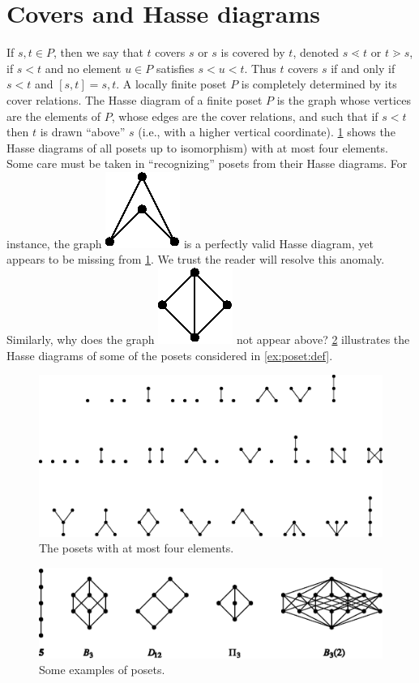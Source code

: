 \section{Covers and Hasse diagrams}

If $s, t \in P$, then we say that $t$ covers $s$ or $s$ is covered by $t$, denoted $s \lessdot t$ or $t \gtrdot s$, if $s < t$ and no element $u \in P$ satisfies $s < u < t$. Thus $t$ covers $s$ if and only if $s < t$ and $[s, t] = {s, t}$. A locally finite poset $P$ is completely determined by its cover relations. The Hasse diagram of a finite poset $P$ is the graph whose vertices are the elements of $P$, whose edges are the cover relations, and such that if $s < t$ then $t$ is drawn “above” $s$ (i.e., with a higher vertical coordinate). \ref{fig:stanley:3-1} shows the Hasse diagrams of all posets up to isomorphism) with at most four elements. Some care must be taken in “recognizing” posets from their Hasse diagrams. For instance, the graph \includegraphics{fig/stanley/3-1:a} is a perfectly valid Hasse diagram, yet appears to be missing from \ref{fig:stanley:3-1}. We trust the reader will resolve this anomaly. Similarly, why does the graph \includegraphics{fig/stanley/3-1:b} not appear above? \ref{fig:stanley:3-2} illustrates the Hasse diagrams of some of the posets considered in \ref{ex:poset:def}. \cite{Stanley:2011:ECV:2124415}

\begin{figure}
	\centering
	\includegraphics[width=\textwidth]{fig/stanley/3-1}
	\caption{\label{fig:stanley:3-1} The posets with at most four elements. \cite{Stanley:2011:ECV:2124415}}
\end{figure}


\begin{figure}
	\centering
	\includegraphics[width=\textwidth]{fig/stanley/3-2}
	\caption{\label{fig:stanley:3-2} Some examples of posets. \cite{Stanley:2011:ECV:2124415}}
\end{figure}